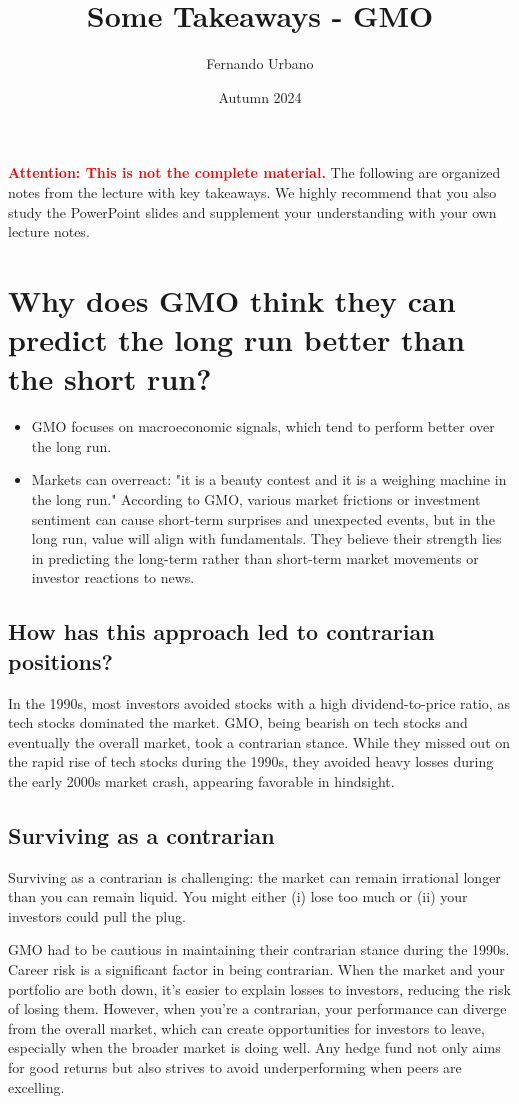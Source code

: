 \documentclass{article}
\title{Some Takeaways - GMO}
\author{Fernando Urbano}
\date{Autumn 2024}
\newcommand{\redbold}[1]{\textbf{\textcolor{red}{#1}}}
\begin{document}
\maketitle

\redbold{Attention: This is not the complete material.} The following are organized notes from the lecture with key takeaways. We highly recommend that you also study the PowerPoint slides and supplement your understanding with your own lecture notes.

\section{Why does GMO think they can predict the long run better than the short run?}
\begin{itemize}
    \item GMO focuses on macroeconomic signals, which tend to perform better over the long run.
    \item Markets can overreact: "it is a beauty contest and it is a weighing machine in the long run." According to GMO, various market frictions or investment sentiment can cause short-term surprises and unexpected events, but in the long run, value will align with fundamentals. They believe their strength lies in predicting the long-term rather than short-term market movements or investor reactions to news.
\end{itemize}

\subsection{How has this approach led to contrarian positions?}
In the 1990s, most investors avoided stocks with a high dividend-to-price ratio, as tech stocks dominated the market. GMO, being bearish on tech stocks and eventually the overall market, took a contrarian stance. While they missed out on the rapid rise of tech stocks during the 1990s, they avoided heavy losses during the early 2000s market crash, appearing favorable in hindsight.

\subsection{Surviving as a contrarian}
Surviving as a contrarian is challenging: the market can remain irrational longer than you can remain liquid. You might either (i) lose too much or (ii) your investors could pull the plug. 

GMO had to be cautious in maintaining their contrarian stance during the 1990s. Career risk is a significant factor in being contrarian. When the market and your portfolio are both down, it’s easier to explain losses to investors, reducing the risk of losing them. However, when you’re a contrarian, your performance can diverge from the overall market, which can create opportunities for investors to leave, especially when the broader market is doing well. Any hedge fund not only aims for good returns but also strives to avoid underperforming when peers are excelling.
\end{document}

